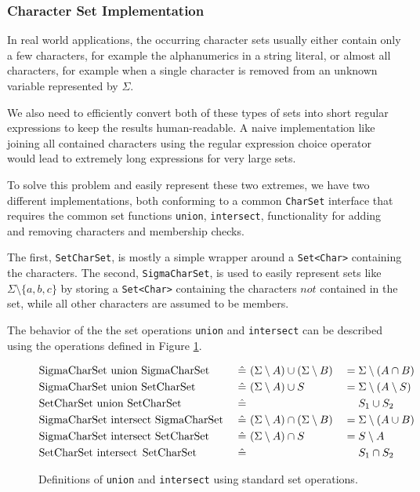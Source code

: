 \subsubsection{Character Set Implementation}

In real world applications, the occurring character sets usually either contain only a few characters, for example the alphanumerics in a string literal, or almost all characters, for example when a single character is removed from an unknown variable represented by $\Sigma$.

We also need to efficiently convert both of these types of sets into short regular expressions to keep the results human-readable. A naive implementation like joining all contained characters using the regular expression choice operator would lead to extremely long expressions for very large sets.

To solve this problem and easily represent these two extremes, we have two different implementations, both conforming to a common \lstinline|CharSet| interface that requires the common set functions \lstinline|union|, \lstinline|intersect|, functionality for adding and removing characters and membership checks.

The first, \lstinline|SetCharSet|, is mostly a simple wrapper around a \lstinline|Set<Char>| containing the characters.
The second, \lstinline|SigmaCharSet|, is used to easily represent sets like $\Sigma \setminus \{a, b, c\}$ by storing a \lstinline|Set<Char>| containing the characters $not$ contained in the set, while all other characters are assumed to be members.

The behavior of the the set operations \lstinline|union| and \lstinline|intersect| can be described using the operations defined in Figure \ref{fig:setops}.

\begin{figure}[H]
\noindent
\begin{alignat*}{3}
	& \text{\lstinline|SigmaCharSet union SigmaCharSet| } && \hat{=}\ (\Sigma \setminus A) \cup (\Sigma \setminus B) & &= \Sigma \setminus (A \cap B) \\
	& \text{\lstinline|SigmaCharSet union SetCharSet| } && \hat{=}\ (\Sigma \setminus A) \cup S & &= \Sigma \setminus (A \setminus S) \\
	& \text{\lstinline|SetCharSet union SetCharSet| } && \hat{=}\ & &\phantom{{}={}} S_1 \cup S_2 \\
	& \text{\lstinline|SigmaCharSet intersect SigmaCharSet| } && \hat{=}\ (\Sigma \setminus A) \cap (\Sigma \setminus B) & &= \Sigma \setminus (A \cup B) \\
	& \text{\lstinline|SigmaCharSet intersect SetCharSet| } && \hat{=}\ (\Sigma \setminus A) \cap S & &= S \setminus A \\
	& \text{\lstinline|SetCharSet intersect SetCharSet| } && \hat{=}\ & &\phantom{{}={}} S_1 \cap S_2
\end{alignat*}
\caption{Definitions of \lstinline|union| and \lstinline|intersect| using standard set operations.}
\label{fig:setops}
\end{figure}

